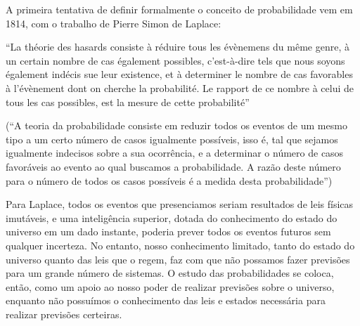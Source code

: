 A primeira tentativa de definir formalmente o conceito de probabilidade vem em 1814,
com o trabalho de Pierre Simon de Laplace:

``La théorie des hasards consiste à réduire tous les évènemens du même genre, à un certain nombre de cas également
possibles, c'est-à-dire tels que nous soyons également indécis sue leur existence, et à determiner le nombre de cas
favorables à l'évènement dont on cherche la probabilité. Le rapport de ce nombre à celui de tous les cas possibles,
est la mesure de cette probabilité'' 
\cite{Laplace1814}

(``A teoria da probabilidade consiste em reduzir todos os eventos de um mesmo tipo a um certo número de casos igualmente
possíveis, isso é, tal que sejamos igualmente indecisos sobre a sua ocorrência, e a determinar o número de casos
favoráveis ao evento ao qual buscamos a probabilidade. A razão deste número para o número de todos os casos possíveis
é a medida desta probabilidade'')

Para Laplace, todos os eventos que presenciamos seriam resultados de leis físicas
imutáveis, e uma inteligência superior, dotada do conhecimento do estado do universo em um dado instante, poderia prever
todos os eventos futuros sem qualquer incerteza. No entanto, nosso conhecimento limitado, tanto do estado do universo
quanto das leis que o regem, faz com que não possamos fazer previsões para um grande número de sistemas. O estudo das 
probabilidades se coloca, então, como um apoio ao nosso poder de realizar previsões sobre o universo, 
enquanto não possuímos o conhecimento das leis e estados necessária para realizar previsões certeiras. 

